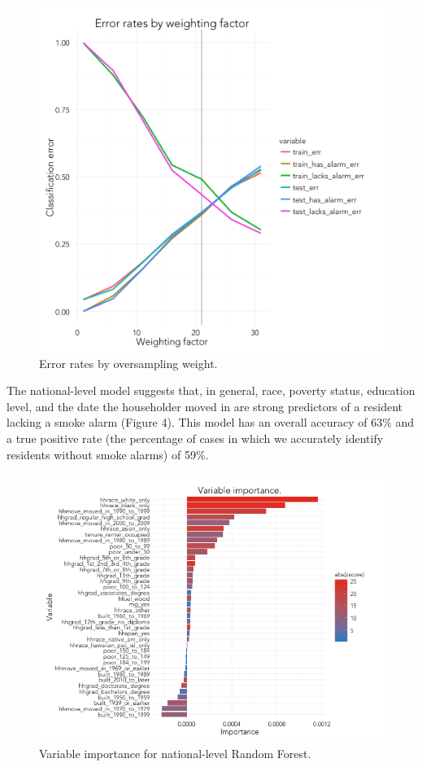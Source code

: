 \documentclass{sig-alternate}
\begin{document}
\begin{figure}
\centering 
\includegraphics[scale=0.36]{test-rf-1.png}
\caption{Error rates by oversampling weight.}
\end{figure}

The national-level model suggests that, in general, race, poverty status, education level, and the date the householder moved in are strong predictors of a resident lacking a smoke alarm (Figure 4).  This model has an overall accuracy of 63\% and a true positive rate (the percentage of cases in which we accurately identify residents without smoke alarms) of 59\%.

\begin{figure}
\centering 
\includegraphics[scale=0.36]{var-importance-1.png}
\caption{Variable importance for national-level Random Forest.}
\end{figure}
\end{document}
